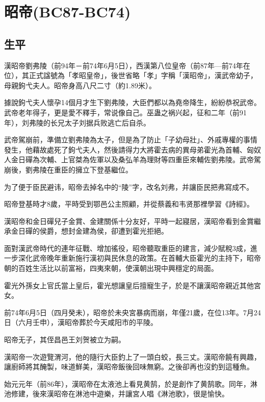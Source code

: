 
\section{昭帝\tiny(BC87-BC74)}

\subsection{生平}

漢昭帝劉弗陵（前94年－前74年6月5日），西漢第八位皇帝（前87年—前74年在位），其正式諡號為「孝昭皇帝」，後世省略「孝」字稱「漢昭帝」，漢武帝幼子，母親鉤弋夫人。昭帝身高八尺二寸（約1.89米）。

據說鉤弋夫人懷孕14個月才生下劉弗陵，大臣們都以為堯帝降生，紛紛恭祝武帝。武帝老年得子，更是愛不釋手，常说像自己。巫蛊之祸兴起，征和二年（前91年），刘弗陵的长兄太子刘据兵败逃亡后自杀。

武帝駕崩前，準備立劉弗陵為太子，但是為了防止「子幼母壯」、外戚專權的事情發生，他藉故處死了鉤弋夫人，然後請得力大將霍去病的異母弟霍光為首輔、匈奴人金日磾為次輔、上官桀為佐軍以及桑弘羊為理財等四重臣來輔佐劉弗陵。武帝駕崩後，劉弗陵在重臣的擁立下登基繼位。

为了便于臣民避讳，昭帝去掉名中的“陵”字，改名刘弗，并讓臣民把弗寫成不。

昭帝登基時才8歲，平時受到鄂邑公主照顧，并從蔡義和韦贤那裡學習《詩經》。

漢昭帝和金日磾兒子金賞、金建關係十分友好，平時一起寢居，漢昭帝看到金賞繼承金日磾的侯爵，想封金建為侯，卻遭到霍光拒絕。

面對漢武帝時代的連年征戰、增加徭役，昭帝聽取重臣的建言，減少賦稅3成，進一步深化武帝晚年重新施行漢初與民休息的政策。在首輔大臣霍光的主持下，昭帝朝的百姓生活比以前富裕，四夷來朝，使漢朝出現中興穩定的局面。

霍光外孫女上官氏當上皇后，霍光想讓皇后擅寵生子，於是不讓漢昭帝親近其他宮女。

前74年6月5日（四月癸未），昭帝於未央宮暴病而崩，年僅21歲，在位13年。7月24日（六月壬申），漢昭帝葬於今天咸阳市的平陵。

昭帝无子，其侄昌邑王刘贺被立为嗣。

漢昭帝一次遊覽渭河，他的隨行大臣釣上了一頭白蛟，長三丈。漢昭帝饒有興趣，讓廚師將其醃製，味道鮮美，漢昭帝飯後回味無窮。之後卻再也沒釣到這種魚。

始元元年（前86年），漢昭帝在太液池上看見黄鹄，於是創作了黄鹄歌。同年，淋池修建，後來漢昭帝在淋池中遊樂，并讓宮人唱《淋池歌》，很是愉快。

